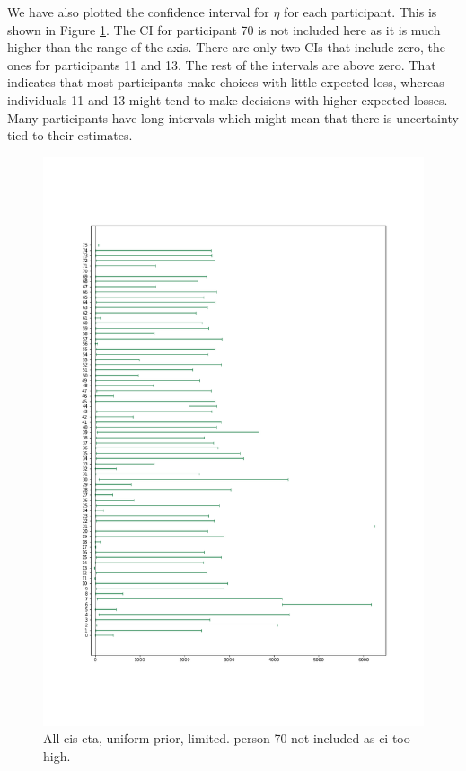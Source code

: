 We have also plotted the confidence interval for $\eta$ for each participant. This is shown in Figure \ref{fig:all_cis_eta_lim}. The CI for participant 70 is not included here as it is much higher than the range of the axis. There are only two CIs that include zero, the ones for participants 11 and 13. The rest of the intervals are above zero. That indicates that most participants make  choices with little expected loss, whereas individuals 11 and 13 might tend to make decisions with higher expected losses. Many participants have long intervals which might mean that there is uncertainty tied to their estimates. 
\begin{figure}
    \centering
    \includegraphics[scale=0.37]{pictures/all_cis_lim_eta.png}
    \caption{All cis eta, uniform prior, limited. person 70 not included as ci too high.}
    \label{fig:all_cis_eta_lim}
\end{figure}


